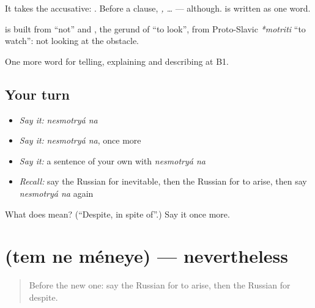 It takes the accusative: \emph{  }. Before a clause, \emph{  , …} — although. \emph{} is written as one word.

\begin{cousinweb}
\textbf{ } is built from \emph{} \textquotedblleft{}not\textquotedblright{} and \emph{}, the gerund of \emph{} \textquotedblleft{}to look\textquotedblright{}, from Proto-Slavic \emph{*motriti} \textquotedblleft{}to watch\textquotedblright{}: not looking at the obstacle.
\end{cousinweb}

\begin{grammarlens}[title={What you've built}]
One more word for telling, explaining and describing at B1.
\end{grammarlens}

\subsection*{Your turn}
\begin{itemize}
\raggedright
  \item \emph{Say it:} \emph{nesmotryá na}
  \item \emph{Say it:} \emph{nesmotryá na}, once more
  \item \emph{Say it:} a sentence of your own with \emph{nesmotryá na}
  \item \emph{Recall:} say the Russian for inevitable, then the Russian for to arise, then say \emph{nesmotryá na} again
\end{itemize}

\begin{tcolorbox}[breakable,colback=teal!4,colframe=teal!35!black,title={Before you move on}]
What does   mean? (\textquotedblleft{}Despite, in spite of\textquotedblright{}.) Say it once more.
\end{tcolorbox}
\section[\texorpdfstring{\ru{тем} \ru{не} \ru{менее} (tem ne méneye)}{тем не менее (tem ne méneye)}]{   (tem ne méneye) — nevertheless}

\label{lesson:RU-C356-tem-ne-menee}



\begin{quote}
Before the new one: say the Russian for to arise, then the Russian for despite.
\end{quote}

